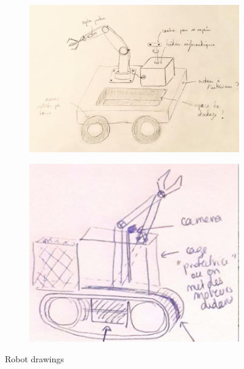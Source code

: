\begin{figure}[H]
\begin{subfigure}{.5\linewidth}
        \caption{}
        \label{fig:Drawing2}
    \end{subfigure}\\[1ex]
    \begin{subfigure}{.5\linewidth}
        \centering
        \includegraphics[scale = 0.3]{Images/Section03/Drawing3.png}
        \caption{}
        \label{fig:Drawing3}
    \end{subfigure}
    \begin{subfigure}{.5\linewidth}
        \centering
        \includegraphics[scale = 0.3]{Images/Section03/Drawing4.png}
        \caption{}
        \label{fig:Drawing4}
    \end{subfigure}
    \caption{Robot drawings}
    \label{fig:Drawings}
\end{figure}

